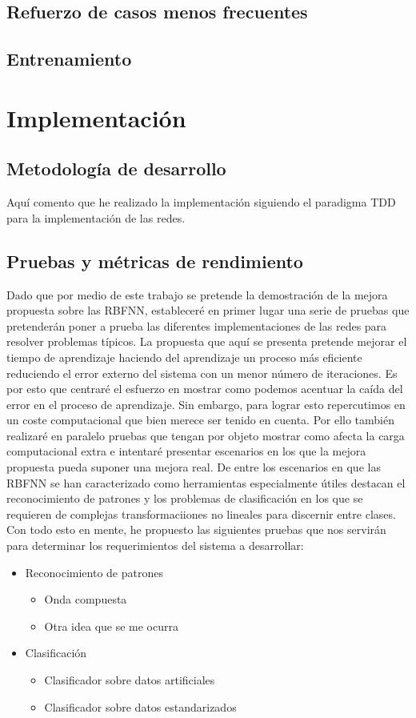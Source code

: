 \documentclass[10pt,a4paper, twocolumn]{report}
\begin{document}
\section{Refuerzo de casos menos frecuentes}
\section{Entrenamiento}
\chapter{Implementación}
\section{Metodología de desarrollo}
Aquí comento que he realizado la implementación siguiendo el paradigma TDD para la implementación de las redes.
\section{Pruebas y métricas de rendimiento}
Dado que por medio de este trabajo se pretende la demostración de la mejora propuesta sobre las RBFNN, estableceré en primer lugar una serie de pruebas que pretenderán poner a prueba las diferentes implementaciones de las redes para resolver problemas típicos.
La propuesta que aquí se presenta pretende mejorar el tiempo de aprendizaje haciendo del aprendizaje un proceso más eficiente reduciendo el error externo del sistema con un menor número de iteraciones. Es por esto que centraré el esfuerzo en mostrar como podemos acentuar la caída del error en el proceso de aprendizaje.
Sin embargo, para lograr esto repercutimos en un coste computacional que bien merece ser tenido en cuenta. Por ello también realizaré en paralelo pruebas que tengan por objeto mostrar como afecta la carga computacional extra e intentaré presentar escenarios en los que la mejora propuesta pueda suponer una mejora real.
De entre los escenarios en que las RBFNN se han caracterizado como herramientas especialmente útiles destacan el reconocimiento de patrones y los problemas de clasificación en los que se requieren de complejas transformaciiones no lineales para discernir entre clases.
Con todo esto en mente, he propuesto las siguientes pruebas que nos servirán para determinar los requerimientos del sistema a desarrollar:
\begin{itemize}
	\item Reconocimiento de patrones
	\begin{itemize}
		\item Onda compuesta
		\item Otra idea que se me ocurra
	\end{itemize}
	\item Clasificación
	\begin{itemize}
		\item Clasificador sobre datos artificiales
		\item Clasificador sobre datos estandarizados
	\end{itemize}
\end{itemize} 
\end{document}

